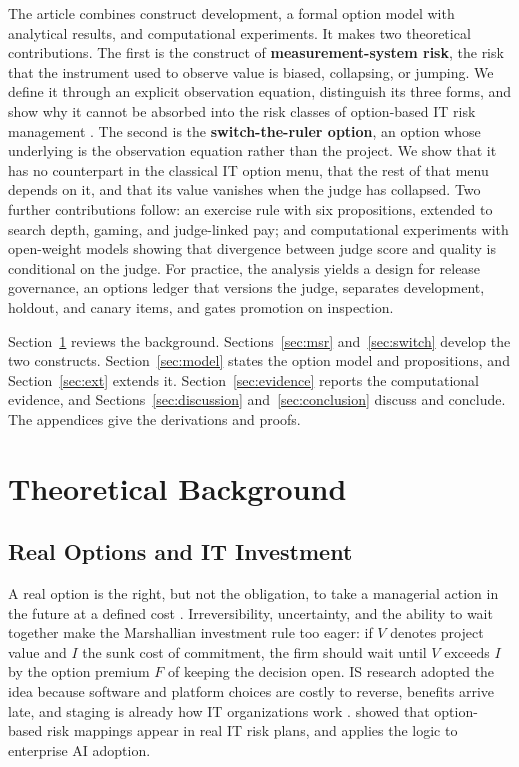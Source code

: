 \documentclass[acmsmall,screen,review]{acmart}
\theoremstyle{acmdefinition}
\begin{document}
The article combines construct development, a formal option model with analytical results, and computational experiments. It makes two theoretical contributions. The first is the construct of \textbf{measurement-system risk}, the risk that the instrument used to observe value is biased, collapsing, or jumping. We define it through an explicit observation equation, distinguish its three forms, and show why it cannot be absorbed into the risk classes of option-based IT risk management \citep{benaroch2006}. The second is the \textbf{switch-the-ruler option}, an option whose underlying is the observation equation rather than the project. We show that it has no counterpart in the classical IT option menu, that the rest of that menu depends on it, and that its value vanishes when the judge has collapsed. Two further contributions follow: an exercise rule with six propositions, extended to search depth, gaming, and judge-linked pay; and computational experiments with open-weight models showing that divergence between judge score and quality is conditional on the judge. For practice, the analysis yields a design for release governance, an options ledger that versions the judge, separates development, holdout, and canary items, and gates promotion on inspection.

Section~\ref{sec:background} reviews the background. Sections~\ref{sec:msr} and~\ref{sec:switch} develop the two constructs. Section~\ref{sec:model} states the option model and propositions, and Section~\ref{sec:ext} extends it. Section~\ref{sec:evidence} reports the computational evidence, and Sections~\ref{sec:discussion} and~\ref{sec:conclusion} discuss and conclude. The appendices give the derivations and proofs.

\section{Theoretical Background}\label{sec:background}

\subsection{Real Options and IT Investment}

A real option is the right, but not the obligation, to take a managerial action in the future at a defined cost \citep{dixit1994,trigeorgis1996}. Irreversibility, uncertainty, and the ability to wait together make the Marshallian investment rule too eager: if $V$ denotes project value and $I$ the sunk cost of commitment, the firm should wait until $V$ exceeds $I$ by the option premium $F$ of keeping the decision open. IS research adopted the idea because software and platform choices are costly to reverse, benefits arrive late, and staging is already how IT organizations work \citep{benaroch2002,fichman2004,taudes2000}. \citet{benaroch2006} showed that option-based risk mappings appear in real IT risk plans, and \citet{tewari2026} applies the logic to enterprise AI adoption.
\end{document}
